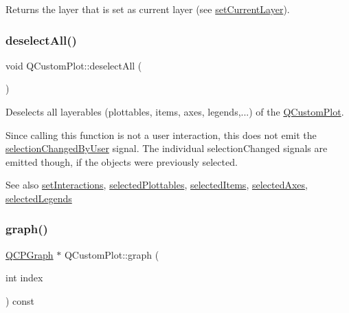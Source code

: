 Returns the layer that is set as current layer (see \hyperlink{class_q_custom_plot_a73a6dc47c653bb6f8f030abca5a11852}{set\+Current\+Layer}). \mbox{\label{class_q_custom_plot_a9d4808ab925b003054085246c92a257c}} 
\subsubsection{\texorpdfstring{deselect\+All()}{deselectAll()}}
{\footnotesize\ttfamily void Q\+Custom\+Plot\+::deselect\+All (\begin{DoxyParamCaption}{ }\end{DoxyParamCaption})}

Deselects all layerables (plottables, items, axes, legends,...) of the \hyperlink{class_q_custom_plot}{Q\+Custom\+Plot}.

Since calling this function is not a user interaction, this does not emit the \hyperlink{class_q_custom_plot_a500c64a109bc773c973ad274f2fa4190}{selection\+Changed\+By\+User} signal. The individual selection\+Changed signals are emitted though, if the objects were previously selected.

\begin{DoxySeeAlso}{See also}
\hyperlink{class_q_custom_plot_a5ee1e2f6ae27419deca53e75907c27e5}{set\+Interactions}, \hyperlink{class_q_custom_plot_a747faaab57c56891e901a1e97fa4359a}{selected\+Plottables}, \hyperlink{class_q_custom_plot_afda487bcf2d6cf1a57173d82495e29ba}{selected\+Items}, \hyperlink{class_q_custom_plot_a7e6b07792b1cb2c31681596582d14dbe}{selected\+Axes}, \hyperlink{class_q_custom_plot_ac87624ddff1cbf4064781a8e8ae321c4}{selected\+Legends} 
\end{DoxySeeAlso}
\mbox{\label{class_q_custom_plot_a6ecae130f684b25276fb47bd3a5875c6}} 
\subsubsection{\texorpdfstring{graph()}{graph()}\hspace{0.1cm}{\footnotesize\ttfamily [1/2]}}
{\footnotesize\ttfamily \hyperlink{class_q_c_p_graph}{Q\+C\+P\+Graph} $\ast$ Q\+Custom\+Plot\+::graph (\begin{DoxyParamCaption}\item[{int}]{index }\end{DoxyParamCaption}) const}

